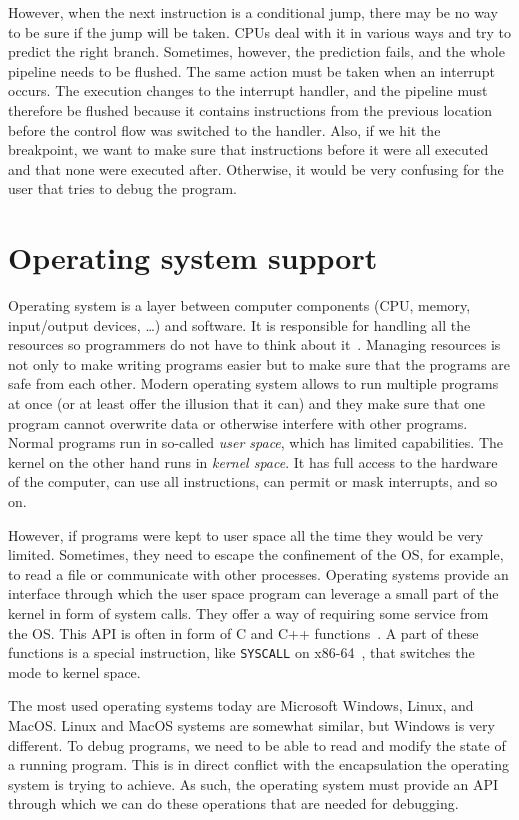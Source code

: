 However, when the next instruction is a conditional jump, there may be no way
to be sure if the jump will be taken. CPUs deal with it in various ways and try
to predict the right branch. Sometimes, however, the prediction fails, and the
whole pipeline needs to be flushed. The same action must be taken when an
interrupt occurs. The execution changes to the interrupt handler, and the
pipeline must therefore be flushed because it contains instructions from the
previous location before the control flow was switched to the handler. Also, if
we hit the breakpoint, we want to make sure that instructions before it were
all executed and that none were executed after. Otherwise, it would be very
confusing for the user that tries to debug the program.

\section{Operating system support}
Operating system is a layer between computer components (CPU, memory,
input/output devices, \dots) and software. It is responsible for handling all
the resources so programmers do not have to think about it~\cite{modern-os,
os-concepts}. Managing resources is not only to make writing programs easier
but to make sure that the programs are safe from each other. Modern operating
system allows to run multiple programs at once (or at least offer the illusion
that it can) and they make sure that one program cannot overwrite data or
otherwise interfere with other programs. Normal programs run in so-called
\textit{user space}, which has limited capabilities. The kernel on the other
hand runs in \textit{kernel space}. It has full access to the hardware of the
computer, can use all instructions, can permit or mask interrupts, and so on.

However, if programs were kept to user space all the time they would be very
limited. Sometimes, they need to escape the confinement of the OS, for example,
to read a file or communicate with other processes. Operating systems provide
an interface through which the user space program can leverage a small part of
the kernel in form of system calls. They offer a way of requiring some service
from the OS. This API is often in form of C and C++
functions~\cite{os-concepts}. A part of these functions is a special
instruction, like \texttt{SYSCALL} on x86-64~\cite{intel-manual}, that switches
the mode to kernel space.

The most used operating systems today are Microsoft Windows, Linux, and MacOS.
Linux and MacOS systems are somewhat similar, but Windows is very different. To
debug programs, we need to be able to read and modify the state of a running
program. This is in direct conflict with the encapsulation the operating system
is trying to achieve. As such, the operating system must provide an API through
which we can do these operations that are needed for debugging.

